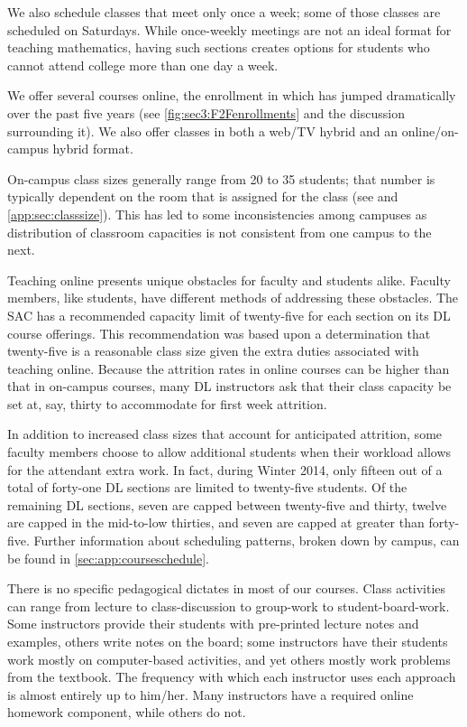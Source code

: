 We also schedule classes that meet only once a week; some of those classes are scheduled on  Saturdays.
While once-weekly meetings are not an ideal format for teaching mathematics, having such sections creates options for students who cannot attend college more than one day a week.

We offer several courses online, the enrollment in which has jumped dramatically over the past five years (see \vref{fig:sec3:F2Fenrollments} and the discussion surrounding it).
We also offer classes in both a web/TV hybrid and an online/on-campus hybrid format.

On-campus class sizes generally range from 20 to 35 students; that number is typically dependent on the room that is assigned for the class (see  and \vref{app:sec:classsize}).
This has led to some inconsistencies among campuses as distribution of classroom capacities is not consistent from one campus to the next.

Teaching online presents unique obstacles for faculty and students alike.
Faculty members, like students, have different methods of addressing these obstacles.
The SAC has a recommended capacity limit of twenty-five for each section on its DL course offerings.
This recommendation was based upon a determination that twenty-five is a reasonable class size given the extra duties associated with teaching online.
Because the attrition rates in online courses can be higher than that in on-campus courses, many DL instructors ask that their class capacity be set at, say, thirty to accommodate for first week attrition.

In addition to increased class sizes that account for anticipated attrition, some faculty members choose to allow additional students when their workload allows for the attendant extra work.
In fact, during Winter 2014, only fifteen out of a total of forty-one DL sections are limited to twenty-five students.
Of the remaining DL sections, seven are capped between twenty-five and thirty, twelve are capped in the mid-to-low thirties, and seven are capped at greater than forty-five.
Further information about scheduling patterns, broken down by campus, can be found in \vref{sec:app:courseschedule}.

There is no specific pedagogical dictates in most of our courses.
Class activities can range from lecture to class-discussion to group-work to student-board-work.
Some instructors provide their students with pre-printed lecture notes and examples, others write notes on the board; some instructors have their students work mostly on computer-based activities, and yet others mostly work problems from the textbook.
The frequency with which each instructor uses each approach is almost entirely up to him/her.
Many instructors have a required online homework component, while others do not.

